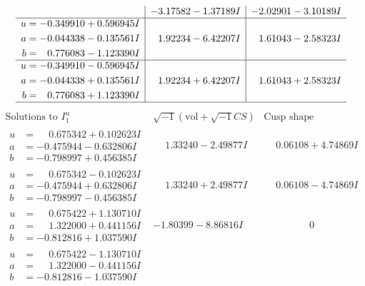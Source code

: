 \documentclass[1p]{elsarticle_modified}
\theoremstyle{definition}
\newcommand{\I}{\sqrt{-1}}
\begin{document}
$$\begin{array}{c|c|c}
 & -3.17582 - 1.37189 I & -2.02901 - 3.10189 I \\ \hline\begin{aligned}
u &= -0.349910 + 0.596945 I \\
a &= -0.044338 - 0.135561 I \\
b &= \phantom{-}0.776083 - 1.123390 I\end{aligned}
 & \phantom{-}1.92234 - 6.42207 I & \phantom{-}1.61043 - 2.58323 I \\ \hline\begin{aligned}
u &= -0.349910 - 0.596945 I \\
a &= -0.044338 + 0.135561 I \\
b &= \phantom{-}0.776083 + 1.123390 I\end{aligned}
 & \phantom{-}1.92234 + 6.42207 I & \phantom{-}1.61043 + 2.58323 I\\
 \hline 
 \end{array}$$\newpage$$\begin{array}{c|c|c}  
\text{Solutions to }I^u_{1}& \I (\text{vol} + \sqrt{-1}CS) & \text{Cusp shape}\\
 \hline 
\begin{aligned}
u &= \phantom{-}0.675342 + 0.102623 I \\
a &= -0.475944 - 0.632806 I \\
b &= -0.798997 + 0.456385 I\end{aligned}
 & \phantom{-}1.33240 - 2.49877 I & \phantom{-}0.06108 + 4.74869 I \\ \hline\begin{aligned}
u &= \phantom{-}0.675342 - 0.102623 I \\
a &= -0.475944 + 0.632806 I \\
b &= -0.798997 - 0.456385 I\end{aligned}
 & \phantom{-}1.33240 + 2.49877 I & \phantom{-}0.06108 - 4.74869 I \\ \hline\begin{aligned}
u &= \phantom{-}0.675422 + 1.130710 I \\
a &= \phantom{-}1.322000 + 0.441156 I \\
b &= -0.812816 + 1.037590 I\end{aligned}
 & -1.80399 - 8.86816 I & \phantom{-0.000000 } 0 \\ \hline\begin{aligned}
u &= \phantom{-}0.675422 - 1.130710 I \\
a &= \phantom{-}1.322000 - 0.441156 I \\
b &= -0.812816 - 1.037590 I\end{aligned}

\end{array}$$
\end{document}
